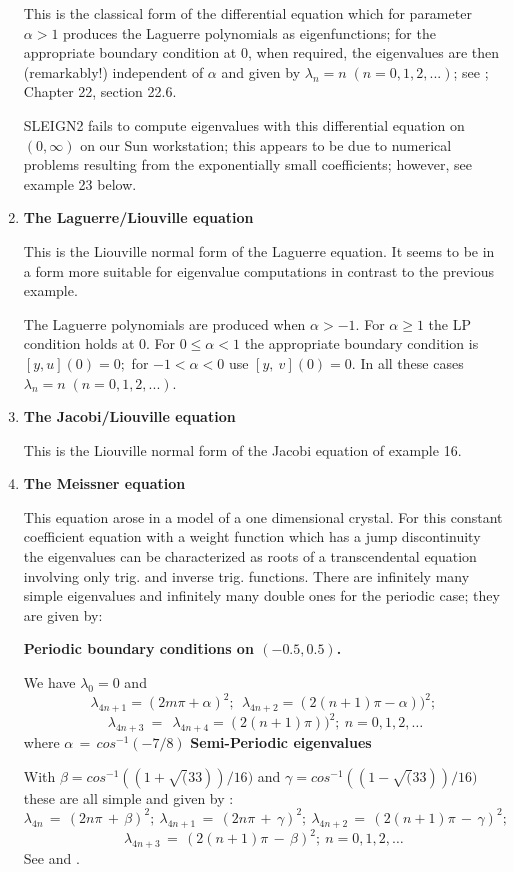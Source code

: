 \begin{enumerate}
This is the classical form of the differential equation which for
parameter $ \alpha > 1 $ produces the Laguerre polynomials as
eigenfunctions; for the appropriate boundary condition at 0, when
required, the eigenvalues are then (remarkably!) independent of $ \alpha $ and given
by $ \lambda_n = n \; (n=0, 1,2,...)$; see \cite{AS}; Chapter 22, section
22.6.

SLEIGN2 fails to compute eigenvalues with this differential equation on $(0, \infty
)$ on our Sun workstation; this appears to be due to numerical problems resulting 
from the exponentially
small coefficients; however, see example 23 below.
\item %
{\bf The Laguerre/Liouville equation}

This is the Liouville normal form of the Laguerre equation. It seems to be in a
form more suitable for eigenvalue computations in contrast to
the previous example.

The Laguerre polynomials are produced when $ \alpha > -1$. 
For $\alpha \geq 1$ the LP condition holds at 0.  For
$0 \leq \alpha < 1$ the appropriate boundary condition is $[y,u] (0) =
0; $ for $ -1 < \alpha < 0 $ use $[y, \ v] (0) = 0$.  In all these cases
$ \lambda_n = n \; (n=0, 1, 2, ...)$.
\item %
{\bf The Jacobi/Liouville equation}

This is the Liouville normal form of the Jacobi equation of example 16.
\item%
{\bf The Meissner equation}

This equation arose in a model of a one dimensional crystal.  For
this constant coefficient equation with a weight function which has a
jump discontinuity the eigenvalues can be characterized as roots of a
transcendental equation involving only trig. and inverse trig. functions. 
There are infinitely many simple eigenvalues and infinitely many double ones 
for the periodic case; they are given by:

{\bf Periodic boundary conditions on $(-0.5, 0.5)$.} 

We have $\lambda_0
 = 0$ and 
$$
 \lambda_{4n+1} = ( 2m \pi + \alpha)^2 ; \ 
 \ \lambda_{4n+2} = ( 2(n+1) \pi - \alpha))^2 ; 
$$
$$
 \ \lambda_{4n+3} \ = \  
 \ \lambda_{4n+4} = ( 2(n+1) \pi ))^2 ; \ n=0,1,2, \ldots
$$
where
$
\alpha \, = \, cos^{-1}(-7/8)
$
{\bf Semi-Periodic eigenvalues}

With $ \beta = cos^{-1}( (1 + \sqrt(33))/16)$ and 
 $ \gamma  = cos^{-1}( (1 - \sqrt(33))/16)$  these are all simple and given by :
$$
\lambda_{4n} \, = \, ( 2n \pi \, + \, \beta)^2 ; \  
\lambda_{4n+1} \, = \, ( 2n \pi \, + \, \gamma )^2 ; \  
\lambda_{4n+2} \, = \, ( 2(n+1) \pi \, - \, \gamma )^2 ; \  
$$
$$
\lambda_{4n+3} \, = \, ( 2(n+1) \pi \, - \, \beta)^2 ; \  n =0, 1, 2, \ldots
$$
See \cite{E} and \cite{Hoc}.
\end{enumerate}


